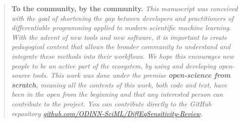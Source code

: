 \begin{quote}
    \textbf{To the community, by the community.}
    \textit{This manuscript was conceived with the goal of shortening the gap between developers and practitioners of differentiable programming applied to  modern scientific machine learning. 
    With the advent of new tools and new software, it is important to create pedagogical content that allows the broader community to understand and integrate these methods into their workflows. 
    We hope this encourages new people to be an active part of the ecosystem, by using and developing open-source tools. 
    This work was done under the premise \textbf{open-science from scratch}, meaning all the contents of this work, both code and text, have been in the open from the beginning and that any interested person can contribute to the project. 
    You can contribute directly to the GitHub repository 
    \url{github.com/ODINN-SciML/DiffEqSensitivity-Review}.
    }
\end{quote}